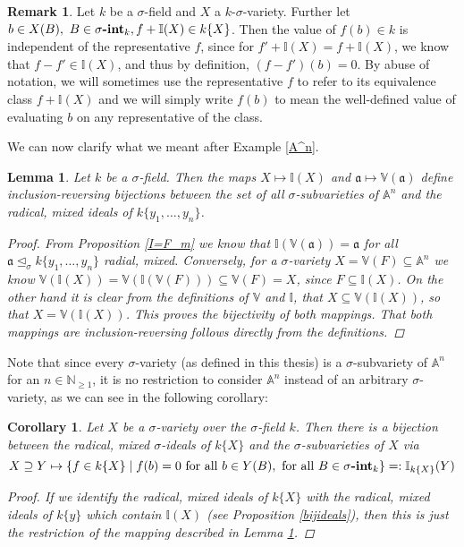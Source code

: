 \documentclass{article}
\def\I{\mathbb{I}}
\def\NE{\mathbb{N}_{\geq1}}
\def\VV{\mathbb{V}}
\def\a{\mathfrak{a}}
\def\s{\sigma}
\def\si{\unlhd_{\sigma}}
\def\fa{\text{ for all }}
\newcommand{\catname}[1]{{\normalfont\textbf{#1}}}
\newcommand{\sintk}{\s\text{\catname{-int}}_k}
\newenvironment{bew}{\begin{proof}[Proof]}{\end{proof}}
\theoremstyle{plain}
\newtheorem{cor}[Satz]{Corollary}
\newtheorem{lem}[Satz]{Lemma}
\theoremstyle{definition}
\newtheorem{rem}[Satz]{Remark}
\begin{document}
\begin{rem}
Let $k$ be a $\s$-field and $X$ a $k$-$\s$-variety. Further let $b \in X(B), ~ B \in \sintk, f + \I(X) \in k\{X\}$. Then the value of $f(b) \in k$ is independent of the representative $f$,
since for $f' + \I(X) = f + \I(X)$, we know that $f - f' \in \I(X)$, and thus by definition, $(f - f')(b) = 0$. By abuse of notation,
we will sometimes use the representative $f$ to refer to its equivalence class $f + \I(X)$ and we will simply write $f(b)$ to mean the well-defined value of evaluating $b$ on any representative of the class.
\end{rem}

We can now clarify what we meant after Example \ref{A^n}.

 \begin{lem}\label{bijsubvarsideals}
Let $k$ be a $\s$-field. Then the maps $X \mapsto \I(X)$ and $\a \mapsto \VV(\a)$ define inclusion-reversing bijections between the set of all $\s$-subvarieties of $\mathbb{A}^n$ and the radical, mixed ideals of $k\{y_1,\ldots,y_n\}$.
\begin{bew}
From Proposition \ref{I=F_m} we know that $\I(\VV(\a)) = \a$ for all $\a \si k\{y_1,\ldots,y_n\}$ radial, mixed. Conversely, for a $\s$-variety $X = \VV(F) \subseteq \mathbb{A}^n$ we know  $\VV(\I(X)) = \VV(\I(\VV(F))) \subseteq \VV(F) = X$,
 since $F \subseteq \I(X)$. On the other hand it is clear from the definitions of $\VV$ and $ \I$, that $X \subseteq \VV(\I(X))$, so that $X = \VV(\I(X))$. This proves the bijectivity of both mappings. That both mappings are inclusion-reversing follows directly from the definitions.
\end{bew}
\end{lem}

Note that since every $\s$-variety (as defined in this thesis) is a $\s$-subvariety of $\mathbb{A}^n$ for an $n \in \NE$, it is no restriction to consider $\mathbb{A}^n$ instead of an arbitrary $\s$-variety, as we can see in the following corollary:
\begin{cor}
  Let $X$ be a $\s$-variety over the $\s$-field $k$. Then there is a bijection between the radical, mixed $\s$-ideals of $k\{X\}$ and the $\s$-subvarieties of $X$ via
 $$X \supseteq Y \mapsto \{f \in k\{X\} \mid f(b) = 0 \fa b \in Y(B), \fa B \in \sintk \} =: \I_{k\{X\}}(Y)$$
\begin{bew}
If we identify the radical, mixed ideals of $k\{X\}$ with the radical, mixed ideals of $k\{y\}$ which contain $\I(X)$ (see Proposition \ref{bijideals}), then this is just the restriction of the mapping described in Lemma \ref{bijsubvarsideals}.
\end{bew}
\end{cor}
\end{document}
